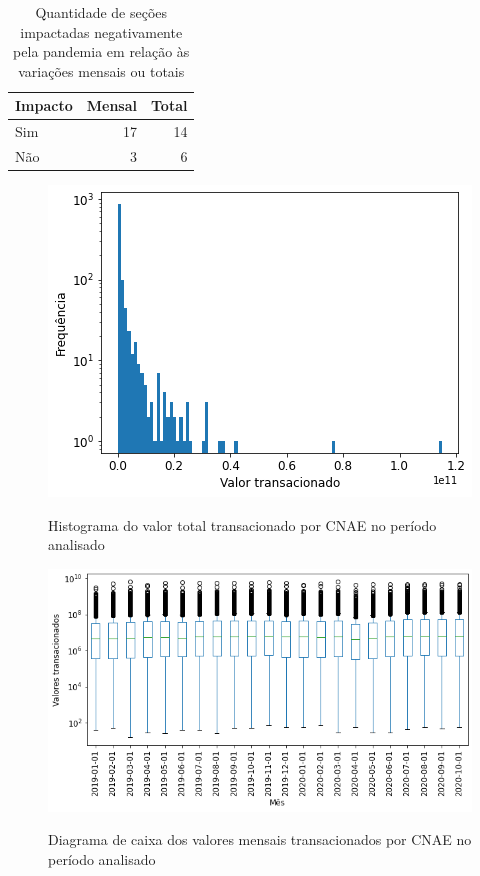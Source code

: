 \begin{table}[htb]
\centering
\caption{Quantidade de seções impactadas negativamente pela pandemia em relação às variações mensais ou totais}
\label{tab:pandemia:impacto-por-secao}
    \begin{tabular}{l|r|r}
        \toprule
        Impacto & Mensal & Total \\
        \midrule
        Sim & 17 & 14 \\
        Não &  3 &  6 \\
        \bottomrule
    \end{tabular}
\fdadospesquisa
\end{table}

\begin{figure}[htb]
	\centering
    \caption{Histograma do valor total transacionado por CNAE no período analisado}
    \includegraphics[scale=0.7]{images/base-de-dados-23.1-valor-total-por-cnae.png}
    \label{fig:pandemia:base-de-dados-23.1-valor-total-por-cnae}
    \fdadospesquisa
\end{figure}

\begin{figure}[htb]
	\centering
    \caption{Diagrama de caixa dos valores mensais transacionados por CNAE no período analisado}
    \includegraphics[scale=0.7]{images/base-de-dados-23.2-valor-mensal-por-cnae.png}
    \label{fig:pandemia:base-de-dados-23.2-valor-mensal-por-cnae}
    \fdadospesquisa
\end{figure}

